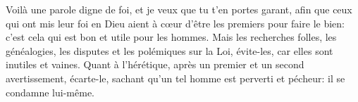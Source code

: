 Voilà une parole digne de foi, et je veux que tu t’en portes garant,
	afin que ceux qui ont mis leur foi en Dieu
		aient à cœur d’être les premiers pour faire le bien:
	c’est cela qui est bon et utile pour les hommes.
Mais les recherches folles, les généalogies, les disputes et les polémiques sur la Loi,
	évite-les, car elles sont inutiles et vaines.
Quant à l’hérétique, après un premier et un second avertissement, écarte-le,
	sachant qu’un tel homme est perverti et pécheur: il se condamne lui-même.
